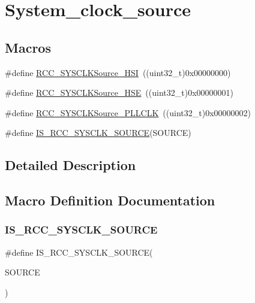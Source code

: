 \hypertarget{group___system__clock__source}{}\section{System\+\_\+clock\+\_\+source}
\label{group___system__clock__source}
\subsection*{Macros}
\begin{DoxyCompactItemize}
\item 
\#define \mbox{\hyperlink{group___system__clock__source_ga0f392254e74dd965c48edd5aad148e20}{R\+C\+C\+\_\+\+S\+Y\+S\+C\+L\+K\+Source\+\_\+\+H\+SI}}~((uint32\+\_\+t)0x00000000)
\item 
\#define \mbox{\hyperlink{group___system__clock__source_gabeae110e41833842f8620647ea0ce85a}{R\+C\+C\+\_\+\+S\+Y\+S\+C\+L\+K\+Source\+\_\+\+H\+SE}}~((uint32\+\_\+t)0x00000001)
\item 
\#define \mbox{\hyperlink{group___system__clock__source_ga9301b7a07a7cb8c2c6ed87b619c1c966}{R\+C\+C\+\_\+\+S\+Y\+S\+C\+L\+K\+Source\+\_\+\+P\+L\+L\+C\+LK}}~((uint32\+\_\+t)0x00000002)
\item 
\#define \mbox{\hyperlink{group___system__clock__source_gaae9d6172a72b0a90cb3703aa59258c57}{I\+S\+\_\+\+R\+C\+C\+\_\+\+S\+Y\+S\+C\+L\+K\+\_\+\+S\+O\+U\+R\+CE}}(S\+O\+U\+R\+CE)
\end{DoxyCompactItemize}


\subsection{Detailed Description}


\subsection{Macro Definition Documentation}
\mbox{\label{group___system__clock__source_gaae9d6172a72b0a90cb3703aa59258c57}} 
\subsubsection{\texorpdfstring{IS\_RCC\_SYSCLK\_SOURCE}{IS\_RCC\_SYSCLK\_SOURCE}}
{\footnotesize\ttfamily \#define I\+S\+\_\+\+R\+C\+C\+\_\+\+S\+Y\+S\+C\+L\+K\+\_\+\+S\+O\+U\+R\+CE(\begin{DoxyParamCaption}\item[{}]{S\+O\+U\+R\+CE }\end{DoxyParamCaption})}

